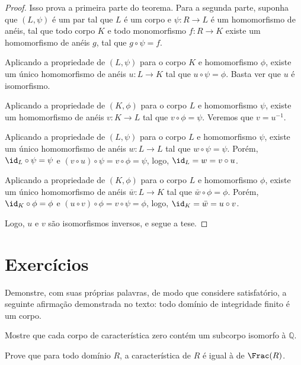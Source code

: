\begin{proof}
    Isso prova a primeira parte do teorema.
    Para a segunda parte, suponha que $(L, \psi)$ é um par tal que $L$ é um corpo e $\psi:R\rightarrow L$ é um homomorfismo de anéis, tal que todo corpo $K$ e todo monomorfismo $f:R\rightarrow K$ existe um homomorfismo de anéis $g$, tal que $g\circ\psi=f$.

    Aplicando a propriedade de $(L, \psi)$ para o corpo $K$ e homomorfismo $\phi$, existe um único homomorfismo de anéis $u:L\rightarrow K$ tal que $u\circ \psi=\phi$.
    Basta ver que $u$ é isomorfismo.

    Aplicando a propriedade de $(K, \phi)$ para o corpo $L$ e homomorfismo $\psi$, existe um homomorfismo de anéis $v:K\rightarrow L$ tal que $v\circ \phi=\psi$.
    Veremos que $v=u^{-1}$.

    Aplicando a propriedade de $(L, \psi)$ para o corpo $L$ e homomorfismo $\psi$, existe um único homomorfismo de anéis $w:L\rightarrow L$ tal que $w\circ \psi=\psi$.
    Porém, $\id_L\circ \psi=\psi$ e $(v\circ u)\circ \psi=v\circ \phi=\psi$, logo, $\id_L=w=v\circ u$.

    Aplicando a propriedade de $(K, \phi)$ para o corpo $L$ e homomorfismo $\phi$, existe um único homomorfismo de anéis $\bar w:L\rightarrow K$ tal que $\bar w\circ \phi=\phi$.
    Porém, $\id_K\circ \phi=\phi$ e $(u\circ v)\circ \phi=v\circ \psi=\phi$, logo, $\id_K=\bar w=u\circ v$.

    Logo, $u$ e $v$ são isomorfismos inversos, e segue a tese.

\end{proof}
\section{Exercícios}
\begin{exer}
    Demonstre, com suas próprias palavras, de modo que considere satisfatório, a seguinte afirmação demonstrada no texto: todo domínio de integridade finito é um corpo.
\end{exer}
\begin{exer}
    Mostre que cada corpo de característica zero contém um subcorpo isomorfo à $\mathbb Q$.
\end{exer}
\begin{exer}
    Prove que para todo domínio $R$, a característica de $R$ é igual à de $\Frac(R)$.
\end{exer}
